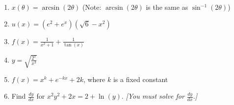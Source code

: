 \documentclass[12pt]{article}
\newcommand{\ds}{\displaystyle}
\begin{document}
\begin{enumerate}
\vfill



\newpage

\item   $\ds x(\theta)=\arcsin(2\theta ) $ (Note: $\arcsin(2 \theta)$ is the same as $\sin^{-1}(2 \theta)$)\\


\vfill

\item   $\ds u(x)=(e^2+e^x)(\sqrt{6}-x^2) $


\vfill

\item   $\ds f(x)=\frac{1}{{x^2+1}}+\frac{1}{\tan(x)}$\\


\vfill

\newpage

\item   $\ds y = \sqrt{\frac{2^{x}}{x^{3}}} $\\


\vfill

\item   $\ds f(x) = x^k+e^{-kx}+2k$, where $k$ is a fixed constant\\

\vfill

\item  Find $\ds \frac{dy}{dx}$ for $\ds 
x^2y^2+2x=2 +\ln(y)
.$ {\it [You must solve for $\ds \frac{dy}{dx}$.]}\\


\vfill

\end{enumerate}
\end{document}
